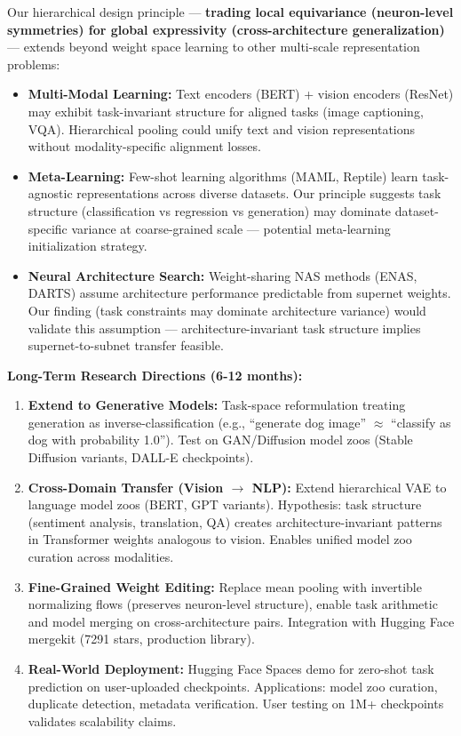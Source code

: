 Our hierarchical design principle --- \textbf{trading local equivariance (neuron-level symmetries) for global expressivity (cross-architecture generalization)} --- extends beyond weight space learning to other multi-scale representation problems:

\begin{itemize}
\item \textbf{Multi-Modal Learning:} Text encoders (BERT) + vision encoders (ResNet) may exhibit task-invariant structure for aligned tasks (image captioning, VQA). Hierarchical pooling could unify text and vision representations without modality-specific alignment losses.

\item \textbf{Meta-Learning:} Few-shot learning algorithms (MAML, Reptile) learn task-agnostic representations across diverse datasets. Our principle suggests task structure (classification vs regression vs generation) may dominate dataset-specific variance at coarse-grained scale --- potential meta-learning initialization strategy.

\item \textbf{Neural Architecture Search:} Weight-sharing NAS methods (ENAS, DARTS) assume architecture performance predictable from supernet weights. Our finding (task constraints may dominate architecture variance) would validate this assumption --- architecture-invariant task structure implies supernet-to-subnet transfer feasible.
\end{itemize}

\textbf{Long-Term Research Directions (6-12 months):}

\begin{enumerate}
\item \textbf{Extend to Generative Models:} Task-space reformulation treating generation as inverse-classification (e.g., ``generate dog image'' $\approx$ ``classify as dog with probability 1.0''). Test on GAN/Diffusion model zoos (Stable Diffusion variants, DALL-E checkpoints).

\item \textbf{Cross-Domain Transfer (Vision $\to$ NLP):} Extend hierarchical VAE to language model zoos (BERT, GPT variants). Hypothesis: task structure (sentiment analysis, translation, QA) creates architecture-invariant patterns in Transformer weights analogous to vision. Enables unified model zoo curation across modalities.

\item \textbf{Fine-Grained Weight Editing:} Replace mean pooling with invertible normalizing flows (preserves neuron-level structure), enable task arithmetic and model merging on cross-architecture pairs. Integration with Hugging Face mergekit (7291 stars, production library).

\item \textbf{Real-World Deployment:} Hugging Face Spaces demo for zero-shot task prediction on user-uploaded checkpoints. Applications: model zoo curation, duplicate detection, metadata verification. User testing on 1M+ checkpoints validates scalability claims.
\end{enumerate}

